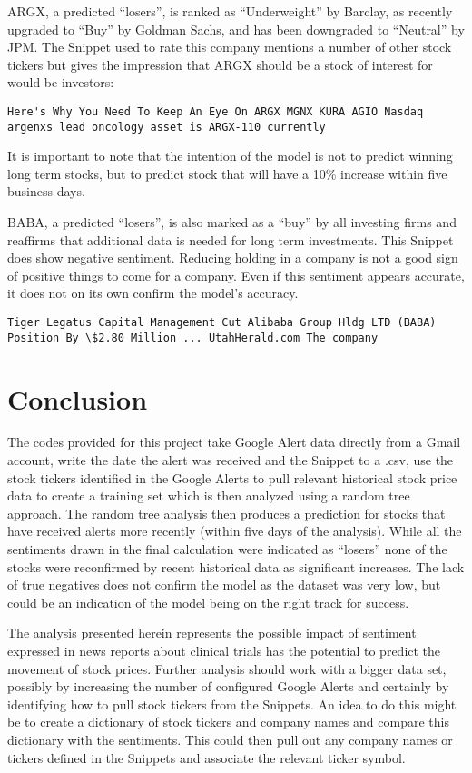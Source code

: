 \documentclass[sigconf]{acmart}
\begin{document}
ARGX, a predicted ``losers'', is ranked as ``Underweight'' by Barclay, as recently upgraded to ``Buy'' by Goldman Sachs, and has been downgraded to ``Neutral'' by JPM. The Snippet used to rate this company mentions a number of other stock tickers but gives the impression that ARGX should be a stock of interest for would be investors:
\begin{lstlisting}
Here's Why You Need To Keep An Eye On ARGX MGNX KURA AGIO Nasdaq argenxs lead oncology asset is ARGX-110 currently
\end{lstlisting}
 It is important to note that the intention of the model is not to predict winning long term stocks, but to predict stock that will have a 10\% increase within five business days.

BABA, a predicted ``losers'', is also marked as a ``buy'' by all investing firms and reaffirms that additional data is needed for long term investments. This Snippet does show negative sentiment. Reducing holding in a company is not a good sign of positive things to come for a company. Even if this sentiment appears accurate, it does not on its own confirm the model's accuracy.
\begin{lstlisting}
Tiger Legatus Capital Management Cut Alibaba Group Hldg LTD (BABA) Position By \$2.80 Million ... UtahHerald.com The company
\end{lstlisting}


\section{Conclusion}
The codes provided for this project take Google Alert data directly from a Gmail account, write the date the alert was received and the Snippet to a .csv, use the stock tickers identified in the Google Alerts to pull relevant historical stock price data to create a training set which is then analyzed using a random tree approach. The random tree analysis then produces a prediction for stocks that have received alerts more recently (within five days of the analysis). While all the sentiments drawn in the final calculation were indicated as ``losers'' none of the stocks were reconfirmed by recent historical data as significant increases. The lack of true negatives does not confirm the model as the dataset was very low, but could be an indication of the model being on the right track for success.

The analysis presented herein represents the possible impact of sentiment expressed in news reports about clinical trials has the potential to predict the movement of stock prices. Further analysis should work with a bigger data set, possibly by increasing the number of configured Google Alerts and certainly by identifying how to pull stock tickers from the Snippets. An idea to do this might be to create a dictionary of stock tickers and company names and compare this dictionary with the sentiments. This could then pull out any company names or tickers defined in the Snippets and associate the relevant ticker symbol. 
\end{document}
